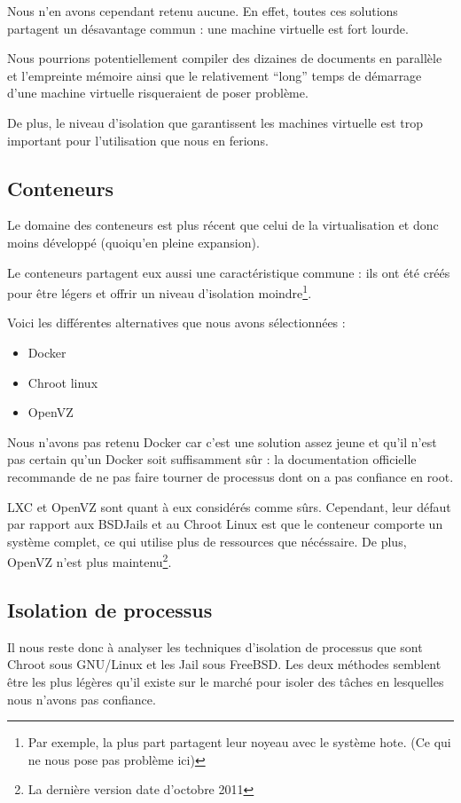 \documentclass[10pt,a4paper]{article}
\begin{document}
Nous n'en avons cependant retenu aucune. En effet, toutes ces solutions partagent un désavantage commun : une machine virtuelle est fort lourde.

Nous pourrions potentiellement compiler des dizaines de documents en parallèle et l'empreinte mémoire ainsi que le relativement ``long'' temps de démarrage d'une machine virtuelle risqueraient de poser problème.

De plus, le niveau d'isolation que garantissent les machines virtuelle est trop important pour l'utilisation que nous en ferions.

\subsection{Conteneurs}
Le domaine des conteneurs est plus récent que celui de la virtualisation et donc moins développé (quoiqu'en pleine expansion).

Le conteneurs partagent eux aussi une caractéristique commune : ils ont été créés pour être légers et offrir un niveau d'isolation moindre\footnote{Par exemple, la plus part partagent leur noyeau avec le système hote. (Ce qui ne nous pose pas problème ici)}.

Voici les différentes alternatives que nous avons sélectionnées :

\begin{itemize}
    \item{Docker}
    \item{Chroot linux}
    \item{OpenVZ}
\end{itemize}

Nous n'avons pas retenu Docker car c'est une solution assez jeune et qu'il n'est pas certain qu'un Docker soit suffisamment sûr : la documentation officielle recommande de ne pas faire tourner de processus dont on a pas confiance en root.

LXC et OpenVZ sont quant à eux considérés comme sûrs.
Cependant, leur défaut par rapport aux BSDJails et au Chroot Linux est que le conteneur comporte un système complet, ce qui utilise plus de ressources que nécéssaire.
De plus, OpenVZ n'est plus maintenu\footnote{La dernière version date d'octobre 2011}.

\subsection{Isolation de processus}

Il nous reste donc à analyser les techniques d'isolation de processus que sont Chroot sous GNU/Linux et les Jail sous FreeBSD.
Les deux méthodes semblent être les plus légères qu'il existe sur le marché pour isoler des tâches en lesquelles nous n'avons pas confiance.
\end{document}
